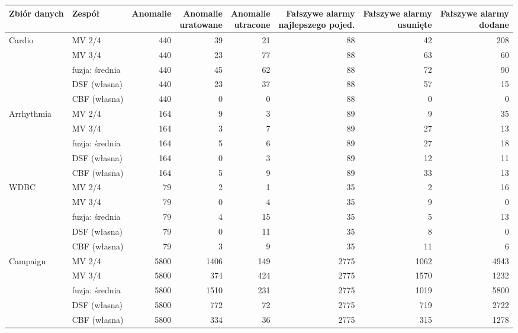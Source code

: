 \begin{tabular}{llrrrrrr}
\toprule
Zbiór danych & Zespół & Anomalie & \makecell[r]{Anomalie\\uratowane} & \makecell[r]{Anomalie\\utracone} & \makecell[r]{Fałszywe alarmy\\najlepszego pojed.} & \makecell[r]{Fałszywe alarmy\\usunięte} & \makecell[r]{Fałszywe alarmy\\dodane} \\
\midrule
Cardio & MV 2/4 & 440 & 39 & 21 & 88 & 42 & 208 \\
 & MV 3/4 & 440 & 23 & 77 & 88 & 63 & 60 \\
 & fuzja: średnia & 440 & 45 & 62 & 88 & 72 & 90 \\
 & DSF (własna) & 440 & 23 & 37 & 88 & 57 & 15 \\
 & CBF (własna) & 440 & 0 & 0 & 88 & 0 & 0 \\
Arrhythmia & MV 2/4 & 164 & 9 & 3 & 89 & 9 & 35 \\
 & MV 3/4 & 164 & 3 & 7 & 89 & 27 & 13 \\
 & fuzja: średnia & 164 & 5 & 6 & 89 & 27 & 18 \\
 & DSF (własna) & 164 & 0 & 3 & 89 & 12 & 11 \\
 & CBF (własna) & 164 & 5 & 9 & 89 & 33 & 13 \\
WDBC & MV 2/4 & 79 & 2 & 1 & 35 & 2 & 16 \\
 & MV 3/4 & 79 & 0 & 4 & 35 & 9 & 0 \\
 & fuzja: średnia & 79 & 4 & 15 & 35 & 5 & 13 \\
 & DSF (własna) & 79 & 0 & 11 & 35 & 8 & 0 \\
 & CBF (własna) & 79 & 3 & 9 & 35 & 11 & 6 \\
Campaign & MV 2/4 & 5800 & 1406 & 149 & 2775 & 1062 & 4943 \\
 & MV 3/4 & 5800 & 374 & 424 & 2775 & 1570 & 1232 \\
 & fuzja: średnia & 5800 & 1510 & 231 & 2775 & 1019 & 5800 \\
 & DSF (własna) & 5800 & 772 & 72 & 2775 & 719 & 2722 \\
 & CBF (własna) & 5800 & 334 & 36 & 2775 & 315 & 1278 \\
\bottomrule
\end{tabular}

